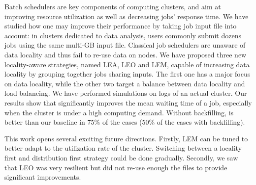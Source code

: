 \documentclass[sigconf,review,anonymous]{acmart}
\newcommand{\rev}[1]{{\color{blue}{#1}}}
\begin{document}
Batch schedulers are key components of computing clusters, and aim at
improving resource utilization as well as decreasing jobs' response
time. We have studied how one may improve their performance by taking
job input file into account: in clusters dedicated to data analysis,
users commonly submit dozens jobs using the same multi-GB input
file. Classical job schedulers are unaware of data locality and thus
fail to re-use data on nodes. We have proposed three new locality-aware
strategies, named LEA, LEO and LEM,
capable of increasing data locality by grouping together 
jobs sharing inputs. The first one has a major focus on data locality,
while the other two target a balance between data locality and load
balancing. We have performed simulations on logs of an actual
cluster. Our results show that \rev{LEA} significantly improves the mean
waiting time of a job, especially  
when the cluster is under a high computing demand.
Without backfilling, \rev{LEA} is better than our baseline in 75\% of the
cases (50\% of the cases with backfilling).
\rev{Our strategy called LEM is the best compromise. It's better than the baseline in more than 75\% of the cases with or without backfilling
(with a median improvement of 7.5\% compared to our baseline without backfilling).}

This work opens several exciting future directions.
Firstly, LEM can be tuned to better adapt to the utilization rate of the cluster.
Switching between a locality first and distribution first strategy could be done 
gradually.
Secondly, we saw that LEO was very resilient but did not re-use enough the files to provide significant improvements.
\rev{
An extension towards workflow scheduling where tasks depend on the output of a previous task would be very useful.
Indeed the output file in memory would be re-used for other jobs, which is a 
new opportunity for locality-aware schedulers.
In the long run, our objective is to consider others issues raised by batch scheduling like
improving fairness between users, or dealing with advance reservations.
Lastly, we want to integrate these strategies into real cluster schedulers
to test their robustness in real-world situations.
}



\end{document}
